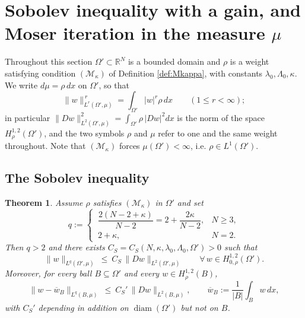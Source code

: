 \documentclass[reqno]{amsart}
\theoremstyle{plain}
\newtheorem{theorem}{Theorem}
\theoremstyle{definition}
\theoremstyle{remark}
\newcommand{\R}{\mathbb{R}}
\begin{document}
\section{Sobolev inequality with a gain, and Moser iteration in the measure \texorpdfstring{$\mu$}{mu}}\label{sec:sobolev}

Throughout this section $\Omega'\subset\R^N$ is a bounded domain and $\rho$ is a weight satisfying
condition $(\mathcal M_\kappa)$ of Definition \ref{def:Mkappa}, with constants
$\lambda_0,\Lambda_0,\kappa$. We write $d\mu=\rho\,dx$ on $\Omega'$, so that
\[
\|w\|_{L^{r}(\Omega',\mu)}^{\,r}=\int_{\Omega'}|w|^{r}\rho\,dx\qquad(1\le r<\infty);
\]
in particular $\|Dw\|_{L^2(\Omega',\mu)}^2=\int_{\Omega'}\rho\,|Dw|^2dx$ is the norm of the space
$H^{1,2}_{\rho}(\Omega')$, and the two symbols $\rho$ and $\mu$ refer to one and the same weight
throughout. Note that
$(\mathcal M_\kappa)$ forces $\mu(\Omega')<\infty$, i.e. $\rho\in L^1(\Omega')$.

\subsection{The Sobolev inequality}

\begin{theorem}\label{thm:sobolev}
Assume $\rho$ satisfies $(\mathcal M_\kappa)$ in $\Omega'$ and set
\begin{equation}\label{eq:qdef}
q:=\begin{cases}\ \dfrac{2(N-2+\kappa)}{N-2}=2+\dfrac{2\kappa}{N-2}, & N\ge3,\\[2mm]
\ 2+\kappa, & N=2 .\end{cases}
\end{equation}
Then $q>2$ and there exists $C_S=C_S(N,\kappa,\lambda_0,\Lambda_0,\Omega')>0$ such that
\begin{equation}\label{eq:sobolev}
\|w\|_{L^{q}(\Omega',\mu)}\ \le\ C_S\,\|Dw\|_{L^2(\Omega',\mu)}
\qquad\forall\,w\in H^{1,2}_{0,\rho}(\Omega') .
\end{equation}
Moreover, for every ball $B\subseteq\Omega'$ and every $w\in H^{1,2}_{\rho}(B)$,
\begin{equation}\label{eq:sobolev-mean}
\|w-\overline w_B\|_{L^{q}(B,\mu)}\ \le\ C_S'\,\|Dw\|_{L^2(B,\mu)},\qquad
\overline w_B:=\frac1{|B|}\int_Bw\,dx ,
\end{equation}
with $C_S'$ depending in addition on $\operatorname{diam}(\Omega')$ but not on $B$.
\end{theorem}
\end{document}
